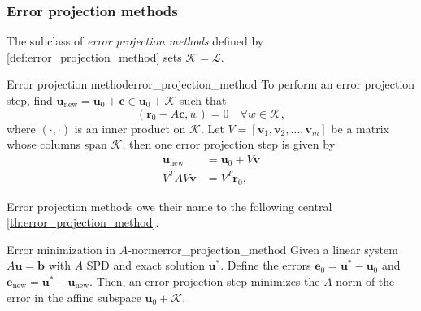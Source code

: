 \subsubsection{Error projection methods}
The subclass of \textit{error projection methods} defined by \cref{def:error_projection_method} sets $\mathcal{K} = \mathcal{L}$.
\begin{fancydef}{Error projection method}{error_projection_method}
  To perform an error projection step, find $\mathbf{u}_{\text{new}} = \mathbf{u}_0 + \mathbf{c} \in \mathbf{u}_0 + \mathcal{K}$ such that
  \begin{equation}
    (\mathbf{r}_0 - A\mathbf{c}, w) = 0 \quad \forall w \in \mathcal{K},
    \label{eq:orthogonality_condition}
  \end{equation}
  where $(\cdot,\cdot)$ is an inner product on $\mathcal{K}$. Let $V = [\mathbf{v}_1, \mathbf{v}_2, \dots, \mathbf{v}_m]$ be a matrix whose columns span $\mathcal{K}$, then one error projection step is given by
  \begin{align*}
    \mathbf{u}_{\text{new}} & = \mathbf{u}_0 + V \mathbf{v} \\
    V^TAV\mathbf{v}         & = V^T\mathbf{r}_0,
  \end{align*}
\end{fancydef}
Error projection methods owe their name to the following central \cref{th:error_projection_method}.
\begin{fancyth}{Error minimization in $A$-norm}{error_projection_method}
  Given a linear system $A\mathbf{u} = \mathbf{b}$ with $A$ SPD and exact solution $\mathbf{u}^{*}$. Define the errors $\mathbf{e}_0 = \mathbf{u}^{*} - \mathbf{u}_0$ and $\mathbf{e}_{\text{new}} = \mathbf{u}^{*} - \mathbf{u}_{\text{new}}$. Then, an error projection step minimizes the $A$-norm of the error in the affine subspace $\mathbf{u}_0 + \mathcal{K}$.
\end{fancyth}
